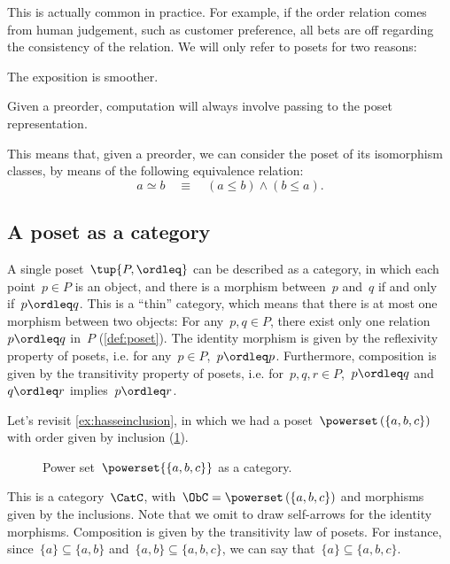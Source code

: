 This is actually common in practice. For example, if the order relation comes from human judgement, such as customer preference, all bets are off regarding the consistency of the relation. We will only refer to posets for two reasons:
\begin{compactenum}
        \item The exposition is smoother.
        \item Given a preorder, computation will always involve passing to the poset representation.
\end{compactenum}
This means that, given a preorder, we can consider the poset of its isomorphism classes, by means of the following equivalence relation:
\begin{equation}
        a \simeq b \quad \equiv \quad (a \leq b) \wedge (b \leq a).
\end{equation}

\subsection{A poset as a category}
\label{sec:posetsarecats}
A single poset~$\tup{P, \ordleq}$ can be described as a category, in which each point~$p\in P$ is an object, and there is a morphism between~$p$ and~$q$ if and only if~$p \ordleq q$. This is a ``thin'' category, which means that there is at most one morphism
between two objects: For any~$p,q\in P$, there exist only one relation~$p\ordleq q$ in~$P$ (\cref{def:poset}). The identity morphism is given by the reflexivity property of posets, i.e. for any~$p\in P$,~$p\ordleq p$. Furthermore, composition is given by the transitivity property of posets, i.e. for~$p,q,r \in P$,~$p\ordleq q$ and~$q\ordleq r$ implies~$p\ordleq r$.

\begin{example}
Let's revisit \cref{ex:hasseinclusion}, in which we had a poset~$\powerset\left(\{a,b,c\}\right)$ with order given by inclusion (\cref{fig:posetascat}).
\begin{figure}[h!]
\begin{center}
\end{center}
\caption{Power set~$\powerset{\{a,b,c\}}$ as a category. \label{fig:posetascat}}
\end{figure}
This is a category~$\CatC$, with~$\ObC=\powerset\left(\{a,b,c\}\right)$ and morphisms given by the inclusions. Note that we omit to draw self-arrows for the identity morphisms. Composition is given by the transitivity law of posets. For instance, since~$\{a\}\subseteq \{a,b\}$ and~$\{a,b\} \subseteq \{a,b,c\}$, we can say that~$\{a\}\subseteq \{a,b,c\}$.
\end{example}

